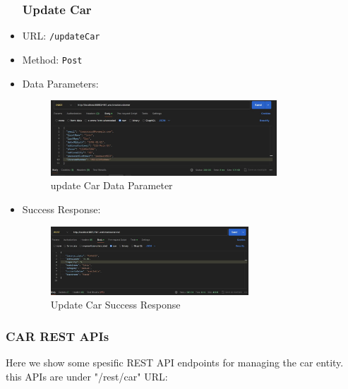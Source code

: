 \begin{itemize}
\subsubsection*{Update Car}
    \item URL: \texttt{/updateCar}
    \item Method: \texttt{Post}
    \item Data Parameters: \\
\begin{figure}[h]
\centering
\includegraphics[width=0.8\textwidth, inner]{sections//BLL/DataParameter1.jpg}
\caption{update Car Data Parameter}
\label{fig:figure1}
\end{figure}
    \item Success Response:
\begin{figure}[h]
\centering
\includegraphics[width=0.7\textwidth, inner]{sections//BLL/updateCar1.jpg}
\caption{Update Car Success Response}
\label{fig:figure1}
\end{figure}\newpage
\newpage
    
\end{itemize}

\subsubsection*{CAR REST APIs}
Here we show some spesific REST API endpoints for managing the car entity. this APIs are under "/rest/car" URL:

